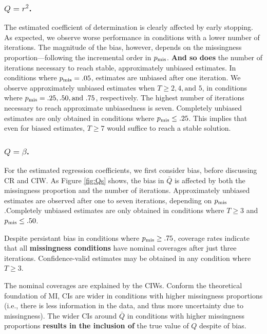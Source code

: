 \documentclass[Royal,times,sageh]{sagej}
\begin{document}
\hypertarget{qr2.}{%
\subsubsection{\texorpdfstring{\(Q=r^2\).}{Q=r\^{}2.}}\label{qr2.}}

The estimated coefficient of determination is clearly affected by early stopping. As expected, we observe worse performance in conditions with a lower number of iterations. The magnitude of the bias, however, depends on the missingness proportion---following the incremental order in \(p_{\rm mis}\). \textbf{And so does} the number of iterations necessary to reach stable, approximately unbiased estimates. In conditions where \(p_{\rm mis}=.05\), estimates are unbiased after one iteration. We observe approximately unbiased estimates when \(T\geq 2,4, \text{and }5\), in conditions where \(p_{\rm mis} = .25, .50, \text{and }.75\), respectively. The highest number of iterations necessary to reach approximate unbiasedness is seven. Completely unbiased estimates are only obtained in conditions where \(p_{\rm mis}\leq.25\). This implies that even for biased estimates, \(T\geq7\) would suffice to reach a stable solution.

\hypertarget{qbeta.}{%
\subsubsection{\texorpdfstring{\(Q=\beta\).}{Q=\textbackslash beta.}}\label{qbeta.}}

For the estimated regression coefficients, we first consider bias, before discussing CR and CIW. As Figure \ref{fig:Qs} shows, the bias in \(\bar{Q}\) is affected by both the missingness proportion and the number of iterations. Approximately unbiased estimates are observed after one to seven iterations, depending on \(p_{\rm mis}\).Completely unbiased estimates are only obtained in conditions where \(T\geq3\) and \(p_{\rm mis}\leq .50\).

Despite persistant bias in conditions where \(p_{\rm mis}\geq.75\), coverage rates indicate that all \textbf{missingness conditions} have nominal coverages after just three iterations. Confidence-valid estimates may be obtained in any condition where \(T\geq3\).

The nominal coverages are explained by the CIWs. Conform the theoretical foundation of MI, CIs are wider in conditions with higher missingness proportions (i.e., there is less information in the data, and thus more uncertainty due to missingness). The wider CIs around \(\bar{Q}\) in conditions with higher missingness proportions \textbf{results in the inclusion of} the true value of \(Q\) despite of bias.
\end{document}

